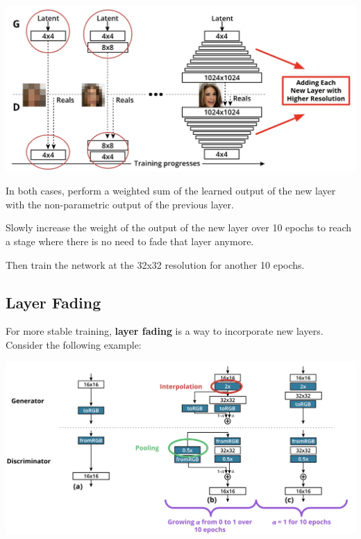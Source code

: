 \includegraphics[width=1\linewidth]{img//genAdvNet//modernGAN/screen-shot-2022-06-30-at-1.47.23-pm.jpeg}

In both cases, perform a weighted sum of the learned output of the new layer with the non-parametric output of the previous layer. \newline

Slowly increase the weight of the output of the new layer over 10 epochs to reach a stage where there is no need to fade that layer anymore. \newline

Then train the network at the 32x32 resolution for another 10 epochs.
\subsection{Layer Fading}
For more stable training, \textbf{layer fading} is a way to incorporate new layers. Consider the following example:

\includegraphics[width=1\linewidth]{img//genAdvNet//modernGAN/screen-shot-2022-06-30-at-1.50.56-pm.jpeg}


